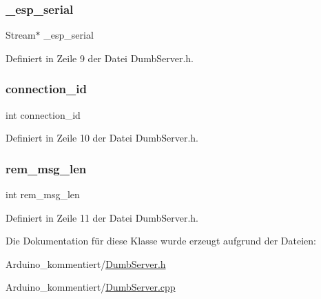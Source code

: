 \subsubsection{\texorpdfstring{\+\_\+esp\+\_\+serial}{\_esp\_serial}}
{\footnotesize\ttfamily Stream$\ast$ \+\_\+esp\+\_\+serial\hspace{0.3cm}{\ttfamily [private]}}



Definiert in Zeile 9 der Datei Dumb\+Server.\+h.

\mbox{\label{classEspServer_a821bd4e05f0b260cc584a2d23bda0fff}} 
\subsubsection{\texorpdfstring{connection\+\_\+id}{connection\_id}}
{\footnotesize\ttfamily int connection\+\_\+id\hspace{0.3cm}{\ttfamily [private]}}



Definiert in Zeile 10 der Datei Dumb\+Server.\+h.

\mbox{\label{classEspServer_a34a62d83c82a13f441af983f9b212e25}} 
\subsubsection{\texorpdfstring{rem\+\_\+msg\+\_\+len}{rem\_msg\_len}}
{\footnotesize\ttfamily int rem\+\_\+msg\+\_\+len\hspace{0.3cm}{\ttfamily [private]}}



Definiert in Zeile 11 der Datei Dumb\+Server.\+h.



Die Dokumentation für diese Klasse wurde erzeugt aufgrund der Dateien\+:\begin{DoxyCompactItemize}
\item 
Arduino\+\_\+kommentiert/\hyperlink{DumbServer_8h}{Dumb\+Server.\+h}\item 
Arduino\+\_\+kommentiert/\hyperlink{DumbServer_8cpp}{Dumb\+Server.\+cpp}\end{DoxyCompactItemize}
